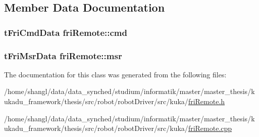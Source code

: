 \subsection{\-Member \-Data \-Documentation}
\hypertarget{classfriRemote_a81bc40f676de878e6a5e4c7382462e15}{
\subsubsection[{cmd}]{\setlength{\rightskip}{0pt plus 5cm}t\-Fri\-Cmd\-Data {\bf fri\-Remote\-::cmd}}}\label{classfriRemote_a81bc40f676de878e6a5e4c7382462e15}
\hypertarget{classfriRemote_ab51535cd4f2d3828e87f03d3aa115346}{
\subsubsection[{msr}]{\setlength{\rightskip}{0pt plus 5cm}t\-Fri\-Msr\-Data {\bf fri\-Remote\-::msr}}}\label{classfriRemote_ab51535cd4f2d3828e87f03d3aa115346}


\-The documentation for this class was generated from the following files\-:\begin{DoxyCompactItemize}
\item 
/home/shangl/data/data\-\_\-synched/studium/informatik/master/master\-\_\-thesis/kukadu\-\_\-framework/thesis/src/robot/robot\-Driver/src/kuka/\hyperlink{friRemote_8h}{fri\-Remote.\-h}\item 
/home/shangl/data/data\-\_\-synched/studium/informatik/master/master\-\_\-thesis/kukadu\-\_\-framework/thesis/src/robot/robot\-Driver/src/kuka/\hyperlink{friRemote_8cpp}{fri\-Remote.\-cpp}\end{DoxyCompactItemize}
